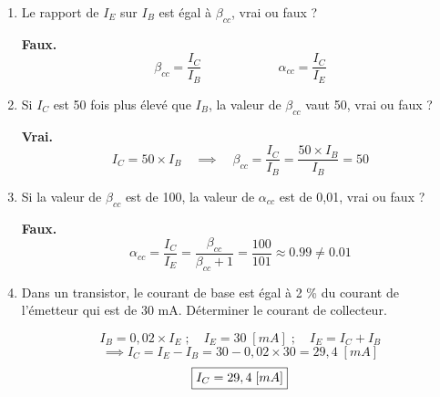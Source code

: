 \documentclass[a4paper]{article}
\begin{document}
\begin{enumerate}
\begin{example}
\begin{center}
    \end{center}
\end{example}





\item Le rapport de $ I_E $ sur $ I_B $ est égal à $ \beta_{cc} $, vrai ou faux ?
\begin{example}
    \textbf{Faux.}
    \[ \beta_{cc} = \frac{I_C}{I_B} \qquad \qquad \qquad \alpha_{cc} = \frac{I_C}{I_E} \]
\end{example}





\item Si $ I_C $ est 50 fois plus élevé que $ I_B $, la valeur de $ \beta_{cc} $ vaut 50, vrai ou faux ?
\begin{example}
    \textbf{Vrai.}
    \[ I_C = 50 \times I_B \quad \implies \quad \beta_{cc} = \frac{I_C}{I_B} = \frac{50 \times I_B}{I_B} = 50 \]
\end{example}





\item Si la valeur de $ \beta_{cc} $ est de 100, la valeur de $ \alpha_{cc} $ est de 0,01, vrai ou faux ?
\begin{example}
    \textbf{Faux.}
    \[ \alpha_{cc} = \frac{I_C}{I_E} = \frac{\beta_{cc}}{\beta_{cc} + 1} = \frac{100}{101} \approx 0.99 \neq 0.01 \]
\end{example}





\item Dans un transistor, le courant de base est égal à 2 \% du courant de l'émetteur qui est de 30 mA. Déterminer le courant de collecteur.
\begin{example}
    \[ I_B = 0,02 \times I_E \; ; \quad I_E = 30 \; [mA] \; ; \quad I_E = I_C + I_B \]
    \[ \implies I_C = I_E - I_B = 30 - 0,02 \times 30 = 29,4 \; [mA] \]
    \[ \fbox{$\displaystyle I_C = 29,4 \; [mA] $} \]
\end{example}






\end{enumerate}
\end{document}
